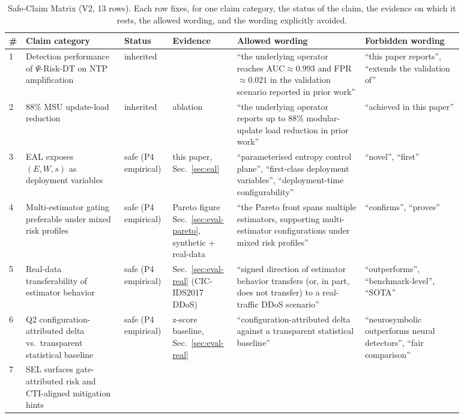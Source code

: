\documentclass[runningheads]{llncs}
\newcommand{\psiop}{\ensuremath{\Psi}}
\begin{document}
\begin{table}[t]
\centering
\caption{Safe-Claim Matrix (V2, 13 rows). Each row fixes, for one claim
category, the status of the claim, the evidence on which it rests, the
allowed wording, and the wording explicitly avoided.}
\label{tab:safe-claim}
\scriptsize
\begin{tabular}{@{}p{0.015\linewidth}p{0.20\linewidth}p{0.08\linewidth}p{0.13\linewidth}p{0.26\linewidth}p{0.20\linewidth}@{}}
\toprule
\textbf{\#} & \textbf{Claim category} & \textbf{Status}
  & \textbf{Evidence} & \textbf{Allowed wording}
  & \textbf{Forbidden wording} \\
\midrule
1 & Detection performance of $\psiop$-Risk-DT on NTP amplification
  & inherited & \cite{paper3}
  & ``the underlying operator reaches AUC$\approx 0.993$ and
    FPR$\approx 0.021$ in the validation scenario reported in prior
    work''
  & ``this paper reports'', ``extends the validation of'' \\
2 & 88\% MSU update-load reduction
  & inherited & \cite{paper3} ablation
  & ``the underlying operator reports up to 88\% modular-update load
    reduction in prior work''
  & ``achieved in this paper'' \\
3 & EAL exposes $(E, W, s)$ as deployment variables
  & safe (P4 empirical) & this paper, Sec.~\ref{sec:eal}
  & ``parameterised entropy control plane'', ``first-class deployment
    variables'', ``deployment-time configurability''
  & ``novel'', ``first'' \\
4 & Multi-estimator gating preferable under mixed risk profiles
  & safe (P4 empirical)
  & Pareto figure Sec.~\ref{sec:eval-pareto}, synthetic + real-data
  & ``the Pareto front spans multiple estimators, supporting
    multi-estimator configurations under mixed risk profiles''
  & ``confirms'', ``proves'' \\
5 & Real-data transferability of estimator behavior
  & safe (P4 empirical) & Sec.~\ref{sec:eval-real} (CIC-IDS2017 DDoS)
  & ``signed direction of estimator behavior transfers (or, in part,
    does not transfer) to a real-traffic DDoS scenario''
  & ``outperforms'', ``benchmark-level'', ``SOTA'' \\
6 & Q2 configuration-attributed delta vs.\ transparent statistical baseline
  & safe (P4 empirical) & z-score baseline, Sec.~\ref{sec:eval-real}
  & ``configuration-attributed delta against a transparent statistical
    baseline''
  & ``neurosymbolic outperforms neural detectors'', ``fair comparison'' \\
7 & SEL surfaces gate-attributed risk and CTI-aligned mitigation hints

\end{tabular}
\end{table}
\end{document}
